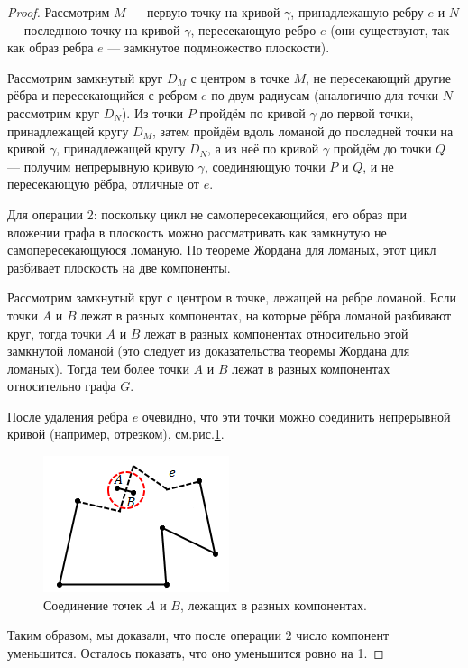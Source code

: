 \begin{proof}
    Рассмотрим $M$ — первую точку на кривой $\gamma$, принадлежащую ребру $e$ и $N$ — последнюю точку на кривой $\gamma$, пересекающую ребро $e$ (они существуют, так как образ ребра $e$ — замкнутое подмножество плоскости).

    Рассмотрим замкнутый круг $D_M$ с центром в точке $M$, не пересекающий другие рёбра и пересекающийся с ребром $e$ по двум радиусам (аналогично для точки $N$ рассмотрим круг $D_N$). Из точки $P$ пройдём по кривой $\gamma$ до первой точки, принадлежащей кругу $D_M$, затем пройдём вдоль ломаной до последней точки на кривой $\gamma$, принадлежащей кругу $D_N$, а из неё по кривой $\gamma$ пройдём до точки $Q$ — получим непрерывную кривую $\gamma$, соединяющую точки $P$ и $Q$, и не пересекающую рёбра, отличные от $e$.

    Для операции 2: поскольку цикл не самопересекающийся, его образ при вложении графа в плоскость можно рассматривать как замкнутую не самопересекающуюся ломаную. По теореме Жордана для ломаных, этот цикл разбивает плоскость на две компоненты.

    Рассмотрим замкнутый круг с центром в точке, лежащей на ребре ломаной. Если точки $A$ и $B$ лежат в разных компонентах, на которые рёбра ломаной разбивают круг, тогда точки $A$ и $B$ лежат в разных компонентах относительно этой замкнутой ломаной (это следует из доказательства теоремы Жордана для ломаных). Тогда тем более точки $A$ и $B$ лежат в разных компонентах относительно графа $G$.

    После удаления ребра $e$ очевидно, что эти точки можно соединить непрерывной кривой (например, отрезком), см.рис.\ref{fig:c6.2}.

    \begin{figure}[h]
        \centering
        \includegraphics[scale=0.8]{images/c6.2.png}
        \caption{Соединение точек $A$ и $B$, лежащих в разных компонентах.}
        \label{fig:c6.2}
    \end{figure}

    Таким образом, мы доказали, что после операции 2 число компонент уменьшится. Осталось показать, что оно уменьшится ровно на 1.


\end{proof}
